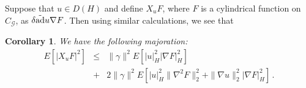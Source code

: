 \documentclass[12pt,a4paper]{book}
\newtheorem{corollary}[theorem]{Corollary}
\newcommand{\ad}{\rm {ad}}
\newcommand{\G}{{\mathcal G}}
\begin{document}
Suppose that $u\in D(H)$ and define $X_u F$, where $F$ is a cylindrical
function on $C_\G$, as $\delta {\tilde{\ad}}u\nabla F$. Then using similar
calculations, we see that
\begin{corollary}
We have the following majoration:
\begin{eqnarray*}
  E[|X_uF|^2]&\leq& \|\gamma\|^2  E\left[|u|_H^2|\nabla F|_H^2\right]\\
 &+&2\|\gamma\|^2E\left[|u|_H^2\|\nabla^2 F\|_2^2+\|\nabla u\|_2^2|\nabla F|_H^2\right]\,.
\end{eqnarray*}
\end{corollary}
\end{document}
